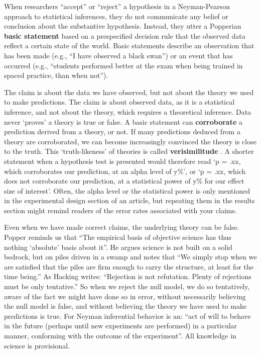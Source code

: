 \documentclass[
  oneside]{book}
\begin{document}
When researchers ``accept'' or ``reject'' a hypothesis in a Neyman-Pearson approach to statistical inferences, they do not communicate any belief or conclusion about the substantive hypothesis. Instead, they utter a Popperian \textbf{basic statement} based on a prespecified decision rule that the observed data reflect a certain state of the world. Basic statements describe an observation that has been made (e.g., ``I have observed a black swan'') or an event that has occurred (e.g., ``students performed better at the exam when being trained in spaced practice, than when not'').

The claim is about the data we have observed, but not about the theory we used to make predictions. The claim is about observed data, as it is a statistical inference, and not about the theory, which requires a theoretical inference. Data never `proves' a theory is true or false. A basic statement can \textbf{corroborate} a prediction derived from a theory, or not. If many predictions deduced from a theory are corroborated, we can become increasingly convinced the theory is close to the truth. This `truth-likeness' of theories is called \textbf{verisimilitude} \citep{niiniluoto_verisimilitude_1998, popper_logic_2002}. A shorter statement when a hypothesis test is presented would therefore read `p = .xx, which corroborates our prediction, at an alpha level of y\%', or `p = .xx, which does not corroborate our prediction, at a statistical power of y\% for our effect size of interest'. Often, the alpha level or the statistical power is only mentioned in the experimental design section of an article, but repeating them in the results section might remind readers of the error rates associated with your claims.

Even when we have made correct claims, the underlying theory can be false. Popper \citeyearpar{popper_logic_2002} reminds us that ``The empirical basis of objective science has thus nothing `absolute' basis about it''. He argues science is not built on a solid bedrock, but on piles driven in a swamp and notes that ``We simply stop when we are satisfied that the piles are firm enough to carry the structure, at least for the time being.'' As Hacking \citeyearpar{hacking_logic_1965} writes: ``Rejection is not refutation. Plenty of rejections must be only tentative.'' So when we reject the null model, we do so tentatively, aware of the fact we might have done so in error, without necessarily believing the null model is false, and without believing the theory we have used to make predictions is true. For Neyman \citeyearpar{neyman_inductive_1957} inferential behavior is an: ``act of will to behave in the future (perhaps until new experiments are performed) in a particular manner, conforming with the outcome of the experiment''. All knowledge in science is provisional.
\end{document}
